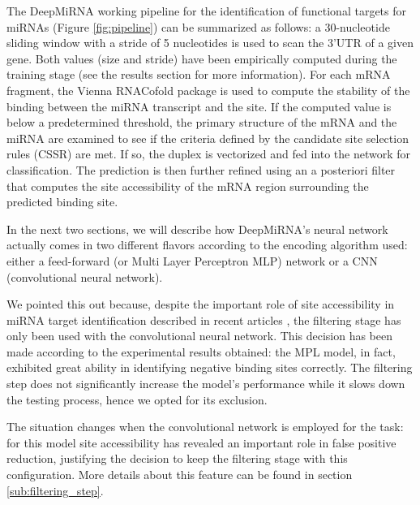 The DeepMiRNA working pipeline for the identification of functional targets for miRNAs (Figure \ref{fig:pipeline}) can be summarized as follows: a 30-nucleotide sliding window with a stride of 5 nucleotides is used to scan the 3'UTR of a given gene. Both values (size and stride) have been empirically computed during the training stage (see the results section for more information). For each mRNA fragment, the Vienna RNACofold package \cite{vienna_rna} is used to compute the stability of the binding between the miRNA transcript and the site. If the computed value is below a predetermined threshold, the primary structure of the mRNA and the miRNA are examined to see if the criteria defined by the candidate site selection rules (CSSR) are met. If so, the duplex is vectorized and fed into the network for classification. The prediction is then further refined using an a posteriori filter that computes the site accessibility of the mRNA region surrounding the predicted binding site. 

In the next two sections, we will describe how DeepMiRNA's neural network actually comes in two different flavors according to the encoding algorithm used: either a feed-forward (or Multi Layer Perceptron MLP) network or a CNN (convolutional neural network).
 
We pointed this out because, despite the important role of site accessibility in miRNA target identification described in recent articles \cite{accessibility_nrg_role} \cite{common_features}, the filtering stage has only been used with the convolutional neural network. This decision has been made according to the experimental results obtained: the MPL model, in fact, exhibited great ability in identifying negative binding sites correctly. The filtering step does not significantly increase the model's performance while it slows down the testing process, hence we opted for its exclusion.

The situation changes when the convolutional network is employed for the task: for this model site accessibility has revealed an important role in false positive reduction, justifying the decision to keep the filtering stage with this configuration. More details about this feature can be found in section \ref{sub:filtering_step}.    

